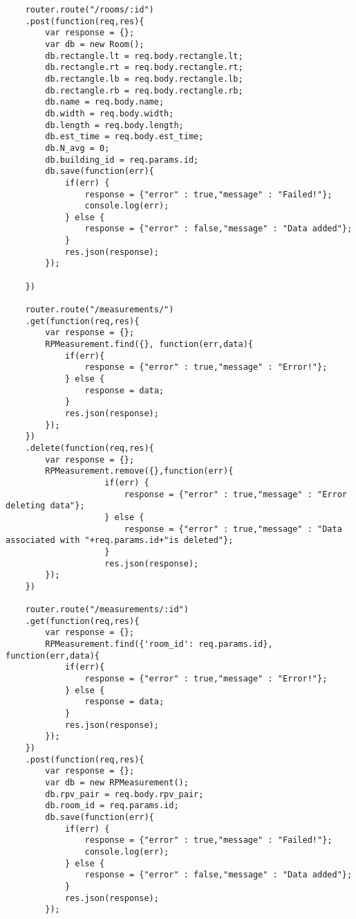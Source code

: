 \begin{lstlisting}
    router.route("/rooms/:id")
    .post(function(req,res){
        var response = {};
        var db = new Room();
        db.rectangle.lt = req.body.rectangle.lt;
        db.rectangle.rt = req.body.rectangle.rt;
        db.rectangle.lb = req.body.rectangle.lb;
        db.rectangle.rb = req.body.rectangle.rb;
        db.name = req.body.name;
        db.width = req.body.width;
        db.length = req.body.length;
        db.est_time = req.body.est_time;
        db.N_avg = 0;
        db.building_id = req.params.id; 
        db.save(function(err){
            if(err) {
                response = {"error" : true,"message" : "Failed!"};
                console.log(err);
            } else {
                response = {"error" : false,"message" : "Data added"};
            }
            res.json(response);
        });

    })

    router.route("/measurements/")
    .get(function(req,res){
        var response = {};
        RPMeasurement.find({}, function(err,data){
            if(err){
                response = {"error" : true,"message" : "Error!"};
            } else {
                response = data;
            }
            res.json(response);
        });
    })
    .delete(function(req,res){
        var response = {};
        RPMeasurement.remove({},function(err){
                    if(err) {
                        response = {"error" : true,"message" : "Error deleting data"};
                    } else {
                        response = {"error" : true,"message" : "Data associated with "+req.params.id+"is deleted"};
                    }
                    res.json(response);
        });
    })

    router.route("/measurements/:id")
    .get(function(req,res){
        var response = {};
        RPMeasurement.find({'room_id': req.params.id}, function(err,data){
            if(err){
                response = {"error" : true,"message" : "Error!"};
            } else {
                response = data;
            }
            res.json(response);
        });
    })
    .post(function(req,res){
        var response = {};
        var db = new RPMeasurement();
        db.rpv_pair = req.body.rpv_pair;
        db.room_id = req.params.id;
        db.save(function(err){
            if(err) {
                response = {"error" : true,"message" : "Failed!"};
                console.log(err);
            } else {
                response = {"error" : false,"message" : "Data added"};
            }
            res.json(response);
        });


\end{lstlisting}
